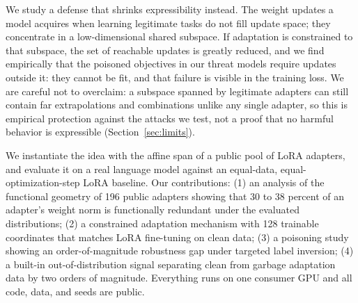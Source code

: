 \documentclass[10pt]{article}
\begin{document}
We study a defense that shrinks expressibility instead. The weight updates a
model acquires when learning legitimate tasks do not fill update space; they
concentrate in a low-dimensional shared subspace. If adaptation is constrained
to that subspace, the set of reachable updates is greatly reduced, and we find
empirically that the poisoned objectives in our threat models require updates
outside it: they cannot be fit, and that failure is visible in the training
loss. We are careful not to overclaim: a subspace spanned by legitimate
adapters can still contain far extrapolations and combinations unlike any
single adapter, so this is empirical protection against the attacks we test,
not a proof that no harmful behavior is expressible (Section~\ref{sec:limits}).

We instantiate the idea with the affine span of a public pool of LoRA adapters,
and evaluate it on a real language model against an equal-data,
equal-optimization-step LoRA baseline. Our contributions: (1) an analysis
of the functional geometry of 196 public adapters showing that 30 to 38
percent of an adapter's weight norm is functionally redundant under the
evaluated distributions; (2) a constrained adaptation mechanism with 128 trainable coordinates
that matches LoRA fine-tuning on clean data; (3) a poisoning study showing an
order-of-magnitude robustness gap under targeted label inversion; (4) a
built-in out-of-distribution signal separating clean from garbage adaptation
data by two orders of magnitude. Everything runs on one consumer GPU and all
code, data, and seeds are public.
\end{document}
